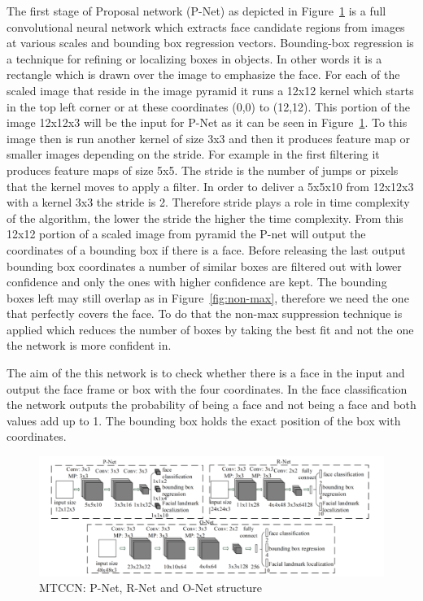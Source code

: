 The first stage of Proposal network (P-Net) as depicted in Figure~\ref{fig:3stages} is a full convolutional neural network which extracts face candidate regions from images at various scales and bounding box regression vectors. Bounding-box regression is a technique for refining or localizing boxes in objects. In other words it is a rectangle which is drawn over the image to emphasize the face. For each of the scaled image that reside in the image pyramid it runs a 12x12 kernel which starts in the top left corner or at these coordinates (0,0) to (12,12). This portion of the image 12x12x3 will be the input for P-Net as it can be seen in Figure~\ref{fig:3stages}. To this image then is run another kernel of size 3x3 and then it produces feature map or smaller images depending on the stride. For example in the first filtering it produces feature maps of size 5x5. The stride is the number of jumps or pixels that the kernel moves to apply a filter. In order to deliver a 5x5x10 from 12x12x3 with a kernel 3x3 the stride is 2. Therefore stride plays a role in time complexity of the algorithm, the lower the stride the higher the time complexity. From this 12x12 portion of a scaled image from pyramid the P-net will output the coordinates of a bounding box if there is a face. Before releasing the last output bounding box coordinates a number of similar boxes are filtered out with lower confidence and only the ones with higher confidence are kept. The bounding boxes left may still overlap as in Figure~\ref{fig:non-max}, therefore we need the one that perfectly covers the face. To do that the non-max suppression technique is applied which reduces the number of boxes by taking the best fit and not the one the network is more confident in. 




The aim of the this network is to check whether there is a face in the input and output the face frame or box with the four coordinates. In the face classification the network outputs the probability of being a face and not being a face and both values add up to 1. The bounding box holds the exact position of the box with coordinates. 


\begin{figure}[!htb]
    \centering
    \includegraphics[width=1\textwidth]{figures/3stages.png}
    \caption{ MTCCN: P-Net, R-Net and O-Net structure}
    \label{fig:3stages}
\end{figure}


